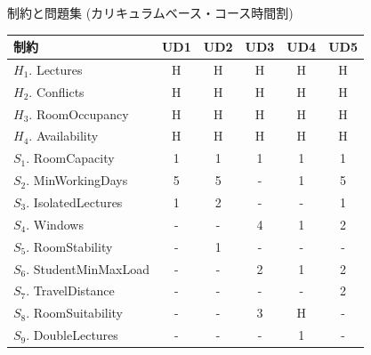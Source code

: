 \documentclass[11pt,dvipdfmx]{beamer}
\begin{document}
\appendix
\begin{frame}{制約と問題集 (カリキュラムベース・コース時間割)}
  \begin{block}{}\small
    \begin{center}
      \begin{tabular}{l|ccccc}%
        制約                      &  UD1  &  UD2  &  UD3  &  UD4  &  UD5  \\
        \hline
        $H_1$. Lectures           &  H    &  H    &  H    &  H    &  H    \\
        $H_2$. Conflicts          &  H    &  H    &  H    &  H    &  H    \\
        $H_3$. RoomOccupancy      &  H    &  H    &  H    &  H    &  H    \\
        $H_4$. Availability       &  H    &  H    &  H    &  H    &  H    \\
        $S_1$. RoomCapacity       &  1    &  1    &  1    &  1    &  1    \\
        $S_2$. MinWorkingDays     &  5    &  5    &  -    &  1    &  5    \\
        $S_3$. IsolatedLectures   &  1    &  2    &  -    &  -    &  1    \\
        $S_4$. Windows            &  -    &  -    &  4    &  1    &  2    \\
        $S_5$. RoomStability      &  -    &  1    &  -    &  -    &  -    \\
        $S_6$. StudentMinMaxLoad  &  -    &  -    &  2    &  1    &  2    \\
        $S_7$. TravelDistance     &  -    &  -    &  -    &  -    &  2    \\
        $S_8$. RoomSuitability    &  -    &  -    &  3    &  H    &  -    \\
        $S_9$. DoubleLectures     &  -    &  -    &  -    &  1    &  -  
      \end{tabular}
    \end{center}
  \end{block}
\end{frame}
\end{document}
